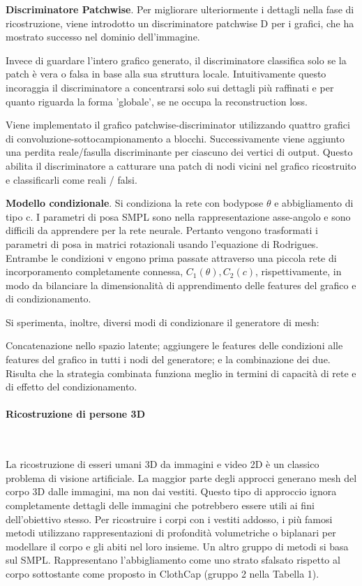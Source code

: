 \medskip

\textbf{Discriminatore Patchwise}. Per migliorare ulteriormente i dettagli nella fase di ricostruzione, viene introdotto un discriminatore patchwise D per i grafici, che ha mostrato successo nel dominio dell'immagine.

Invece di guardare l'intero grafico generato, il discriminatore classifica solo se la patch è vera o falsa in base alla sua struttura locale. Intuitivamente questo incoraggia il discriminatore a concentrarsi solo sui
dettagli più raffinati e per quanto riguarda la forma 'globale', se ne occupa la reconstruction loss.

\medskip

Viene implementato il grafico patchwise-discriminator utilizzando quattro grafici di convoluzione-sottocampionamento a
blocchi. Successivamente viene aggiunto una perdita reale/fasulla discriminante per ciascuno dei vertici di output.  Questo abilita il discriminatore
a catturare una patch di nodi vicini nel grafico ricostruito e classificarli come reali / falsi.

\medskip

\textbf{Modello condizionale}. Si condiziona la rete con bodypose $\theta$ e abbigliamento di tipo c. I parametri di posa SMPL sono
nella rappresentazione asse-angolo e sono difficili da apprendere per la rete neurale.
Pertanto vengono trasformati i parametri di posa in matrici rotazionali usando l'equazione di Rodrigues.
Entrambe le condizioni v engono prima passate attraverso una piccola rete di incorporamento completamente connessa, $C_{1}(\theta), C_{2}(c)$, rispettivamente, in modo da bilanciare la dimensionalità di apprendimento delle features del grafico e di condizionamento.

\medskip

Si sperimenta, inoltre, diversi modi di condizionare il generatore di mesh: 

Concatenazione nello spazio latente; aggiungere le features delle condizioni alle features del grafico in tutti i nodi del generatore; e la combinazione dei due. Risulta che la strategia combinata funziona meglio in termini di capacità di rete e di effetto del condizionamento.


\paragraph{Ricostruzione di persone 3D}~

La ricostruzione di esseri umani 3D da immagini e video 2D è un classico problema di visione artificiale.
La maggior parte degli approcci generano mesh del corpo 3D dalle immagini, ma non dai vestiti.
Questo tipo di approccio ignora completamente dettagli delle immagini che potrebbero essere utili ai fini dell’obiettivo stesso.
Per ricostruire i corpi con i vestiti addosso, i più famosi metodi utilizzano rappresentazioni di profondità volumetriche  o biplanari per modellare il corpo e gli abiti nel loro insieme.
Un altro gruppo di metodi si basa sul SMPL.
Rappresentano l'abbigliamento come uno strato sfalsato rispetto al corpo sottostante come proposto in ClothCap (gruppo 2 nella Tabella 1).

